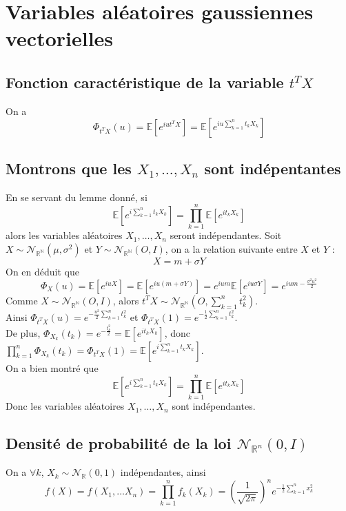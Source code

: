 \documentclass{report}
\begin{document}
	\section{Variables aléatoires gaussiennes vectorielles}
		\subsection{Fonction caractéristique de la variable $t^TX$}
			On a 
			\[\Phi_{t^TX}(u) = \mathbb{E}[e^{iut^TX}] = \mathbb{E}[e^{iu\sum\limits_{k=1}^{n}t_kX_k}] \]
		\subsection{Montrons que les $X_1, \ldots, X_n$ sont indépentantes}
			En se servant du lemme donné, si 
			\[\mathbb{E}[e^{i\sum\limits_{k=1}^{n}t_kX_k}] = \prod\limits_{k=1}^{n}\mathbb{E}[e^{it_kX_k}]\]
			alors les variables aléatoires $X_1, \ldots, X_n$ seront indépendantes.
			Soit $X \sim \mathcal{N}_{\mathbb{R}^\mathbb{N}}(\mu, \sigma^2)$ et $Y \sim \mathcal{N}_{\mathbb{R}^\mathbb{N}}(O, I)$, on a la relation suivante entre $X$ et $Y$ :
			\[ X = m + \sigma Y \]
			On en déduit que
			\[ \Phi_X(u) = \mathbb{E}[e^{iuX}] = \mathbb{E}[e^{iu(m+\sigma Y)}] = e^{ium}\mathbb{E}[e^{iu\sigma Y}] = e^{ium-\frac{\sigma^2 u^2}{2}} \]
			Comme $X \sim \mathcal{N}_{\mathbb{R}^\mathbb{N}}(O, I)$, alors $t^TX \sim \mathcal{N}_{\mathbb{R}^\mathbb{N}}(O, \sum\limits_{k=1}^{n}t_k^2)$.\\
			Ainsi $\Phi_{t^TX}(u) = e^{-\frac{u^2}{2}\sum\limits_{k=1}^{n}t_k^2}$ et $\Phi_{t^TX}(1) = e^{-\frac{1}{2}\sum\limits_{k=1}^{n}t_k^2}$.\\
			De plus, $\Phi_{X_k}(t_k) = e^{-\frac{t_k^2}{2}} = \mathbb{E}[e^{it_kX_k}] $, donc $\prod\limits_{k=1}^{n}\Phi_{X_k}(t_k) = \Phi_{t^TX}(1) = \mathbb{E}[e^{i\sum\limits_{k=1}^{n}t_kX_k}] $.\\
			On a bien montré que 
			\[\mathbb{E}[e^{i\sum\limits_{k=1}^{n}t_kX_k}] = \prod\limits_{k=1}^{n}\mathbb{E}[e^{it_kX_k}]\]
			Donc les variables aléatoires $X_1, \ldots, X_n$ sont indépendantes.
		\subsection{Densité de probabilité de la loi $\mathcal{N}_{\mathbb{R}^n}(0, I)$}
			On a $\forall k$, $X_k \sim \mathcal{N}_{\mathbb{R}}(0, 1)$ indépendantes, ainsi
			\[ f(X) = f(X_1, \ldots X_n) = \prod\limits_{k=1}^{n}f_k(X_k) = (\frac{1}{\sqrt{2\pi}})^ne^{-\frac{1}{2}\sum\limits_{k=1}^{n}x_k^2} \]
\end{document}
